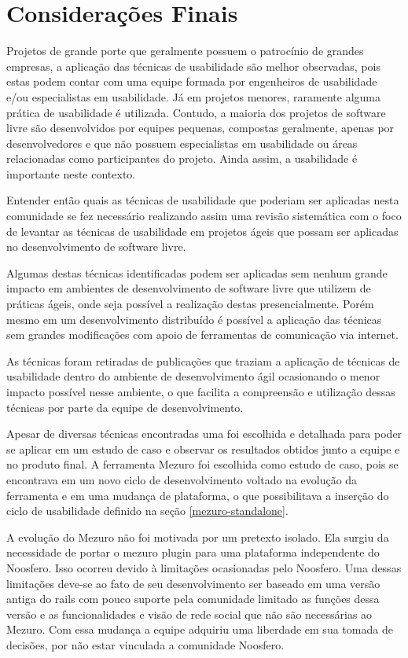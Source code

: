 \chapter{Considerações Finais}
\label{cap-consideracoes}

%
Projetos de grande porte que geralmente possuem o patrocínio de grandes empresas, a aplicação das técnicas de usabilidade são melhor observadas, pois estas podem contar com uma equipe formada por engenheiros de usabilidade e/ou especialistas em usabilidade. Já em projetos menores, raramente alguma prática de usabilidade é utilizada. Contudo, a maioria dos projetos de software livre são desenvolvidos por equipes pequenas, compostas geralmente, apenas por desenvolvedores e que não possuem especialistas em usabilidade ou áreas relacionadas como participantes do projeto. Ainda assim, a usabilidade é importante neste contexto.

Entender então quais as técnicas de usabilidade que poderiam ser aplicadas nesta comunidade se fez necessário realizando assim uma revisão sistemática com o foco de levantar as técnicas de usabilidade em projetos ágeis que possam ser aplicadas no desenvolvimento de software livre.

%
Algumas destas técnicas identificadas podem ser aplicadas sem nenhum grande impacto em ambientes de desenvolvimento de software livre que utilizem de práticas ágeis, onde seja possível a realização destas presencialmente. Porém mesmo em um desenvolvimento distribuído é possível a aplicação das técnicas sem grandes modificações com apoio de ferramentas de comunicação via internet.

%
As técnicas foram retiradas de publicações que traziam a aplicação de técnicas de usabilidade dentro do ambiente de desenvolvimento ágil ocasionando o menor impacto possível nesse ambiente, o que facilita a compreensão e utilização dessas técnicas por parte da equipe de desenvolvimento.

%
Apesar de diversas técnicas encontradas uma foi escolhida e detalhada para poder se aplicar em um estudo de caso e observar os resultados obtidos junto a equipe e no produto final. A ferramenta Mezuro foi escolhida como estudo de caso, pois se encontrava em um novo ciclo de desenvolvimento voltado na evolução da ferramenta e em uma mudança de plataforma, o que possibilitava a inserção do ciclo de usabilidade definido na seção \ref{mezuro-standalone}.

%
A evolução do Mezuro não foi motivada por um pretexto isolado. Ela surgiu da necessidade de portar o mezuro plugin para uma plataforma independente do Noosfero. Isso ocorreu devido à limitações ocasionadas pelo Noosfero. Uma dessas limitações deve-se ao fato de seu desenvolvimento ser baseado em uma versão antiga do rails com pouco suporte pela comunidade limitado as funções dessa versão e as funcionalidades e visão de rede social que não são necessárias ao Mezuro. Com essa mudança a equipe adquiriu uma liberdade em sua tomada de decisões, por não estar vinculada a comunidade Noosfero.

